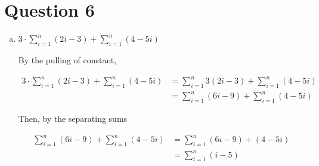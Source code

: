 \documentclass[12pt]{article}
\begin{document}
\section*{Question 6}
\begin{enumerate}[a.]
    \item

    $3 \cdot \sum\limits_{i=1}^n (2i - 3) + \sum\limits_{i=1}^n (4 - 5i)$

    \bigskip

    By the pulling of constant,

    \begin{align*}
        3 \cdot \sum\limits_{i=1}^n (2i - 3) + \sum\limits_{i=1}^n (4 - 5i) &= \sum\limits_{i=1}^n 3(2i-3) + \sum\limits_{i=1}^n (4 - 5i)\\
        &= \sum\limits_{i=1}^n (6i-9) + \sum\limits_{i=1}^n (4 - 5i)
    \end{align*}

    \bigskip

    Then, by the separating sums

    \begin{align*}
        \sum\limits_{i=1}^n (6i-9) + \sum\limits_{i=1}^n (4 - 5i) &= \sum\limits_{i=1}^n (6i-9) + (4 - 5i)\\
        &= \sum\limits_{i=1}^n (i-5)
    \end{align*}
\end{enumerate}
\end{document}
